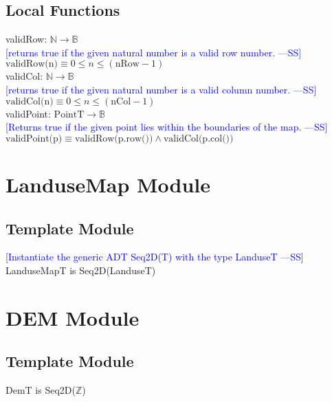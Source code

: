 \documentclass[12pt]{article}
\newcommand{\authornote}[3]{\textcolor{#1}{[#3 ---#2]}}
\newcommand{\authornote}[3]{}
\newcommand{\wss}[1]{\authornote{blue}{SS}{#1}}
\begin{document}
\subsection*{Local Functions}

\noindent validRow: $\mathbb{N} \rightarrow \mathbb{B}$\\
\noindent \wss{returns true if the given natural number is a valid row
  number.}\\
$\mbox{validRow(n)} \equiv 0 \leq n \leq (\mbox{nRow} - 1)$\\

\noindent validCol: $\mathbb{N} \rightarrow \mathbb{B}$\\
\noindent \wss{returns true if the given natural number is a valid column
  number.}\\
$\mbox{validCol(n)} \equiv 0 \leq n \leq (\mbox{nCol} - 1)$\\

\noindent validPoint: $\mbox{PointT} \rightarrow \mathbb{B}$\\
\noindent \wss{Returns true if the given point lies within the boundaries of the
  map.}\\
$\mbox{validPoint(p)} \equiv \mbox{validRow(p.row())} \land \mbox{validCol(p.col())}$\\

\newpage

\section* {LanduseMap Module}

\subsection* {Template Module}

\wss{Instantiate the generic ADT Seq2D(T) with the type LanduseT}\\
LanduseMapT is Seq2D(LanduseT)

\newpage

\section* {DEM Module}

\subsection* {Template Module}

DemT is Seq2D($\mathbb{Z}$)
\end{document}
